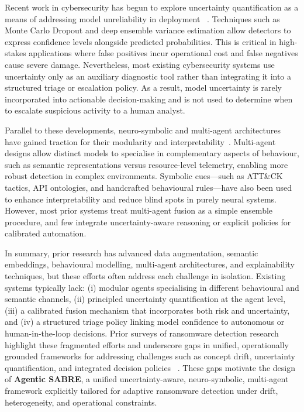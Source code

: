 \documentclass[3p]{elsarticle}
\begin{document}
Recent work in cybersecurity has begun to explore uncertainty quantification as a means of addressing model unreliability in deployment ~\cite{gal2016dropout, gawlikowski2023Uncertainity, kabuye2025explainable}. Techniques such as Monte Carlo Dropout and deep ensemble variance estimation allow detectors to express confidence levels alongside predicted probabilities. This is critical in high-stakes applications where false positives incur operational cost and false negatives cause severe damage. Nevertheless, most existing cybersecurity systems use uncertainty only as an auxiliary diagnostic tool rather than integrating it into a structured triage or escalation policy. As a result, model uncertainty is rarely incorporated into actionable decision-making and is not used to determine when to escalate suspicious activity to a human analyst.

Parallel to these developments, neuro-symbolic and multi-agent architectures have gained traction for their modularity and interpretability~\cite{Besold2021neurosymbolicsurvey}. Multi-agent designs allow distinct models to specialise in complementary aspects of behaviour, such as semantic representations versus resource-level telemetry, enabling more robust detection in complex environments. Symbolic cues—such as ATT\&CK tactics, API ontologies, and handcrafted behavioural rules—have also been used to enhance interpretability and reduce blind spots in purely neural systems. However, most prior systems treat multi-agent fusion as a simple ensemble procedure, and few integrate uncertainty-aware reasoning or explicit policies for calibrated automation.

In summary, prior research has advanced data augmentation, semantic embeddings, behavioural modelling, multi-agent architectures, and explainability techniques, but these efforts often address each challenge in isolation. Existing systems typically lack: (i) modular agents specialising in different behavioural and semantic channels, (ii) principled uncertainty quantification at the agent level, (iii) a calibrated fusion mechanism that incorporates both risk and uncertainty, and (iv) a structured triage policy linking model confidence to autonomous or human-in-the-loop decisions. Prior surveys of ransomware detection research highlight these fragmented efforts and underscore gaps in unified, operationally grounded frameworks for addressing challenges such as concept drift, uncertainty quantification, and integrated decision policies ~\cite{Ispahany2024Survey}. These gaps motivate the design of \textbf{Agentic SABRE}, a unified uncertainty-aware, neuro-symbolic, multi-agent framework explicitly tailored for adaptive ransomware detection under drift, heterogeneity, and operational constraints.
\end{document}
